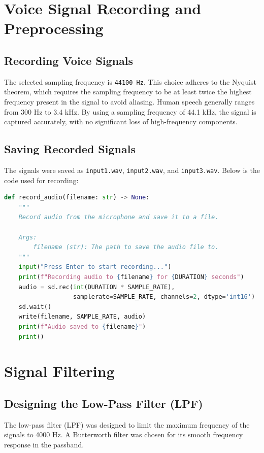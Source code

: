 \documentclass[12pt,a4paper]{article}
\begin{document}
\newpage

\section{Voice Signal Recording and Preprocessing}

\subsection{Recording Voice Signals}
The selected sampling frequency is \texttt{44100 Hz}. This choice adheres to the Nyquist theorem, which requires the sampling frequency to be at least twice the highest frequency present in the signal to avoid aliasing. Human speech generally ranges from 300 Hz to 3.4 kHz. By using a sampling frequency of 44.1 kHz, the signal is captured accurately, with no significant loss of high-frequency components.

\subsection{Saving Recorded Signals}
The signals were saved as \texttt{input1.wav}, \texttt{input2.wav}, and \texttt{input3.wav}. Below is the code used for recording:
\begin{lstlisting}[language=Python, caption=Voice Recording Code]
def record_audio(filename: str) -> None:
    """
    Record audio from the microphone and save it to a file.

    Args:
        filename (str): The path to save the audio file to.
    """
    input("Press Enter to start recording...")
    print(f"Recording audio to {filename} for {DURATION} seconds")
    audio = sd.rec(int(DURATION * SAMPLE_RATE),
                   samplerate=SAMPLE_RATE, channels=2, dtype='int16')
    sd.wait()
    write(filename, SAMPLE_RATE, audio)
    print(f"Audio saved to {filename}")
    print()
\end{lstlisting}

\newpage

\section{Signal Filtering}

\subsection{Designing the Low-Pass Filter (LPF)}
The low-pass filter (LPF) was designed to limit the maximum frequency of the signals to 4000 Hz. A Butterworth filter was chosen for its smooth frequency response in the passband. 
\end{document}
